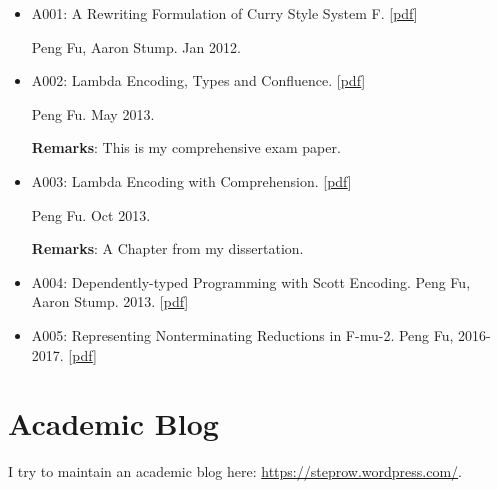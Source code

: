 \documentclass[10pt]{article}
\begin{document}
\begin{itemize}

\item A001: A Rewriting Formulation of Curry Style System F. [\href{../../document/notes/rewrite-f.pdf}{pdf}]

\noindent Peng Fu, Aaron Stump. Jan 2012.

\item A002: Lambda Encoding, Types and Confluence. [\href{../../document/notes/comp-exam.pdf}{pdf}]

\noindent Peng Fu. May 2013.

\noindent \textbf{Remarks}: This is my comprehensive exam paper. 

\item A003: Lambda Encoding with Comprehension. [\href{../../document/notes/comprehension.pdf}{pdf}]

\noindent Peng Fu. Oct 2013.

\noindent \textbf{Remarks}: A Chapter from my dissertation.


\item A004: Dependently-typed Programming with Scott Encoding. Peng Fu, Aaron Stump. 2013. [\href{../../document/papers/scott-dep.pdf}{pdf}]
 
\item A005: Representing Nonterminating Reductions in F-mu-2. Peng Fu, 2016-2017. [\href{../../document/papers/nonterm.pdf}{pdf}]

\end{itemize}
\section*{Academic Blog}
I try to maintain an academic blog here: \url{https://steprow.wordpress.com/}. 
\end{document}
